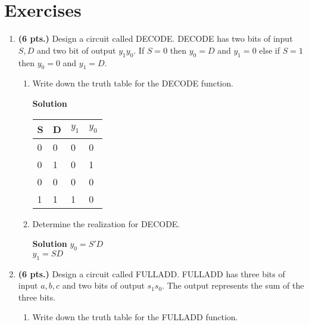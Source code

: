 \section{Exercises}
\label{section:minimizationExercises}
\graphicspath{ {./chapter03/FigHw} }

\begin{enumerate}
\item \textbf{ (6 pts.)} Design a circuit called DECODE.  DECODE has two bits of 
input $S, D$ and two bit of output $y_1 y_0$.  If $S=0$ then $y_0=D$ and 
$y_1=0$ else if $S=1$ then $y_0=0$ and $y_1 = D$.
\begin{enumerate}
        \item Write down the truth table for the DECODE function.


\begin{onlysolution}  \textbf{Solution} \itshape{
	\begin{tabular}{l|l||l|l}
	S & D & $y_1$ & $y_0$ \\ \hline
	0 & 0 & 0   & 0   \\ \hline
	0 & 1 & 0   & 1   \\ \hline
	0 & 0 & 0   & 0   \\ \hline
	1 & 1 & 1   & 0   \\ 
	\end{tabular}
} \end{onlysolution} 
        \item Determine the \SOPmin realization for DECODE.


\begin{onlysolution}  \textbf{Solution} \itshape{
$y_0 = S'D$\\
$y_1 = S D$
} \end{onlysolution} 
\end{enumerate}

\item \textbf{ (6 pts.)} Design a circuit called FULLADD.  FULLADD has 
three bits of input $a,b,c$ and two bits of output $s_1 s_0$.  The output 
represents the sum of the three bits.
\begin{enumerate}
        \item Write down the truth table for the FULLADD function.



\end{enumerate}
\end{enumerate}

